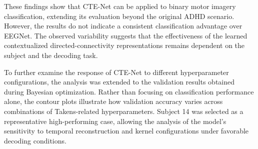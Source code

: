 These findings show that CTE-Net can be applied to binary motor imagery classification, extending its evaluation beyond the original ADHD scenario. However, the results do not indicate a consistent classification advantage over EEGNet. The observed variability suggests that the effectiveness of the learned contextualized directed-connectivity representations remains dependent on the subject and the decoding task.

To further examine the response of CTE-Net to different hyperparameter configurations, the analysis was extended to the validation results obtained during Bayesian optimization. Rather than focusing on classification performance alone, the contour plots illustrate how validation accuracy varies across combinations of Takens-related hyperparameters. Subject 14 was selected as a representative high-performing case, allowing the analysis of the model's sensitivity to temporal reconstruction and kernel configurations under favorable decoding conditions.

